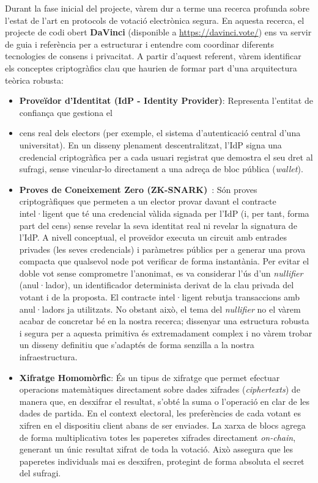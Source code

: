 Durant la fase inicial del projecte, vàrem dur a terme una recerca profunda sobre l'estat de l'art en protocols de
votació electrònica segura.
En aquesta recerca, el projecte de codi obert \textbf{DaVinci} (disponible a \url{https://davinci.vote/}) ens va servir
de guia i referència per a estructurar i entendre com coordinar diferents tecnologies de consens i privacitat.
A partir d'aquest referent, vàrem identificar els conceptes criptogràfics clau que haurien de formar part d'una
arquitectura teòrica robusta:

\begin{itemize}
    \item \textbf{Proveïdor d'Identitat (IdP - Identity Provider)}: Representa l'entitat de confiança que gestiona el
    \item cens real dels electors (per exemple, el sistema d'autenticació central d'una universitat).
    En un disseny plenament descentralitzat, l'\ac{IdP} signa una credencial criptogràfica per a cada usuari registrat que
    demostra el seu dret al sufragi, sense vincular-lo directament a una adreça de bloc pública (\textit{wallet}).

    \item \textbf{Proves de Coneixement Zero (ZK-SNARK)}~\cite{goldwasser1989knowledge,groth2016size}: Són proves criptogràfiques que permeten a un elector provar
    davant el contracte intel·ligent que té una credencial vàlida signada per l'\ac{IdP} (i, per tant, forma part del
    cens) sense revelar la seva identitat real ni revelar la signatura de l'\ac{IdP}\@.
    A nivell conceptual, el proveïdor executa un circuit amb entrades privades (les seves credencials) i paràmetres
    públics per a generar una prova compacta que qualsevol node pot verificar de forma instantània.
    Per evitar el doble vot sense comprometre l'anonimat, es va considerar l'ús d'un \textit{nullifier} (anul·lador), un
    identificador determinista derivat de la clau privada del votant i de la proposta.
    El contracte intel·ligent rebutja transaccions amb anul·ladors ja utilitzats.
    No obstant això, el tema del \textit{nullifier} no el vàrem acabar de concretar bé en la nostra recerca; dissenyar
    una estructura robusta i segura per a aquesta primitiva és extremadament complex i no vàrem trobar un disseny
    definitiu que s'adaptés de forma senzilla a la nostra infraestructura.

    \item \textbf{Xifratge Homomòrfic}: És un tipus de xifratge que permet efectuar operacions matemàtiques directament
    sobre dades xifrades (\textit{ciphertexts}) de manera que, en desxifrar el resultat, s'obté la suma o l'operació en
    clar de les dades de partida.
    En el context electoral, les preferències de cada votant es xifren en el dispositiu client abans de ser enviades.
    La xarxa de blocs agrega de forma multiplicativa totes les paperetes xifrades directament \textit{on-chain},
    generant un únic resultat xifrat de toda la votació.
    Això assegura que les paperetes individuals mai es desxifren, protegint de forma absoluta el secret del sufragi.


\end{itemize}
